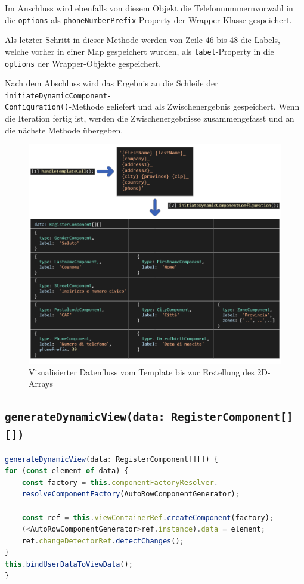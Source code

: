 Im Anschluss wird ebenfalls von diesem Objekt die Telefonnummernvorwahl in die \texttt{options} als \texttt{phoneNumberPrefix}-Property der Wrapper-Klasse gespeichert.

Als letzter Schritt in dieser Methode werden von Zeile 46 bis 48 die Labels, welche vorher in einer Map gespeichert wurden, als \texttt{label}-Property in die \texttt{options} der Wrapper-Objekte gespeichert. 

Nach dem Abschluss wird das Ergebnis an die Schleife der \texttt{initiateDynamicComponent-\\Configuration()}-Methode geliefert und als Zwischenergebnis gespeichert. Wenn die Iteration fertig ist, werden die Zwischenergebnisse zusammengefasst und an die nächste Methode übergeben.

\begin{figure}[h]
	\centerline{
		\includegraphics[width=1\textwidth, frame]{./grafiken/RF_Visualisierter Ablauf_1.png}
	}
	\vskip0pt
	\caption{Visualisierter Datenfluss vom Template bis zur Erstellung des 2D-Arrays}
\end{figure}

\subsection{\texttt{generateDynamicView(data: RegisterComponent[][])}}

\begin{lstlisting}[caption={Die \texttt{generateDynamicView()}-Methode}, language=JavaScript,label={lst:generateDynamicView}]
generateDynamicView(data: RegisterComponent[][]) {
for (const element of data) {
	const factory = this.componentFactoryResolver.
	resolveComponentFactory(AutoRowComponentGenerator);
	
	const ref = this.viewContainerRef.createComponent(factory);
	(<AutoRowComponentGenerator>ref.instance).data = element;
	ref.changeDetectorRef.detectChanges();
}
this.bindUserDataToViewData();
}
\end{lstlisting}

